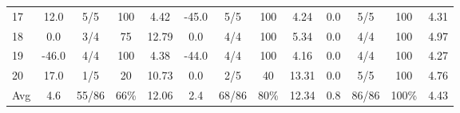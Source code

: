 \begin{table}[p]
{\begin{tabular}{l|cccc|cccc|cccc}
17 & 12.0 & 5/5 & 100 & 4.42 & -45.0 & 5/5 & 100 & 4.24 & 0.0 & 5/5 & 100 & 4.31 \\
18 & 0.0 & 3/4 & 75 & 12.79 & 0.0 & 4/4 & 100 & 5.34 & 0.0 & 4/4 & 100 & 4.97 \\
19 & -46.0 & 4/4 & 100 & 4.38 & -44.0 & 4/4 & 100 & 4.16 & 0.0 & 4/4 & 100 & 4.27 \\
20 & 17.0 & 1/5 & 20 & 10.73 & 0.0 & 2/5 & 40 & 13.31 & 0.0 & 5/5 & 100 & 4.76 \\
\midrule
Avg & 4.6 & 55/86 & 66\% & 12.06 & 2.4 & 68/86 & 80\% & 12.34 & 0.8 & 86/86 & 100\% & 4.43 \\
\bottomrule
\end{tabular}%
}
\end{table}

